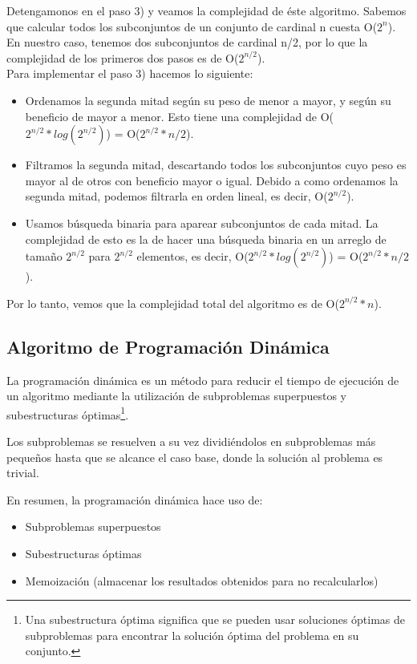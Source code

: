 Detengamonos en el paso 3) y veamos la complejidad de éste algoritmo. Sabemos que calcular todos los subconjuntos de un conjunto de cardinal n cuesta O($2^{n}$). En nuestro caso, tenemos dos subconjuntos de cardinal n/2, por lo que la complejidad de los primeros dos pasos es de O($2^{n/2}$). \\
Para implementar el paso 3) hacemos lo siguiente:
\begin{itemize}
\item Ordenamos la segunda mitad según su peso de menor a mayor, y según su beneficio de mayor a menor. Esto tiene una complejidad de O($2^{n/2} * log(2^{n/2})$) = O($2^{n/2} * n/2$).
\item Filtramos la segunda mitad, descartando todos los subconjuntos cuyo peso es mayor al de otros con beneficio mayor o igual. Debido a como ordenamos la segunda mitad, podemos filtrarla en orden lineal, es decir, O($2^{n/2}$).
\item Usamos búsqueda binaria para aparear subconjuntos de cada mitad. La complejidad de esto es la de hacer una búsqueda binaria en un arreglo de tamaño $2^{n/2}$ para $2^{n/2}$ elementos, es decir, O($2^{n/2} * log(2^{n/2})$) = O($2^{n/2} * n/2$).
\end{itemize}

\bigskip

Por lo tanto, vemos que la complejidad total del algoritmo es de O($2^{n/2} * n$).

\subsection{Algoritmo de Programación Dinámica}
La programación dinámica es un método para reducir el tiempo de ejecución de un algoritmo mediante la utilización de subproblemas superpuestos y subestructuras óptimas\footnote{Una subestructura óptima significa que se pueden usar soluciones óptimas de subproblemas para encontrar la solución óptima del problema en su conjunto.}.

Los subproblemas se resuelven a su vez dividiéndolos en subproblemas más pequeños hasta que se alcance el caso base, donde la solución al problema es trivial.


En resumen, la programación dinámica hace uso de:
\begin{itemize}
	\item Subproblemas superpuestos
	\item Subestructuras óptimas
	\item Memoización (almacenar los resultados obtenidos para no recalcularlos)
\end{itemize}


